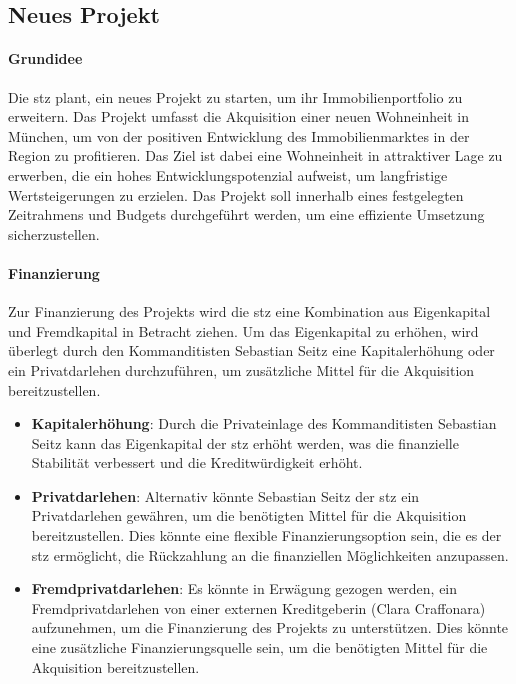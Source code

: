 \subsection{Neues Projekt} \label{subsec:Neues Projekt}


\paragraph{Grundidee} \label{para:Grundidee}

\par Die \gls{stz} plant, ein neues Projekt zu starten, um ihr Immobilienportfolio zu erweitern. Das Projekt umfasst die Akquisition einer neuen Wohneinheit in München, um von der positiven Entwicklung des Immobilienmarktes in der Region zu profitieren. Das Ziel ist dabei eine Wohneinheit in attraktiver Lage zu erwerben, die ein hohes Entwicklungspotenzial aufweist, um langfristige Wertsteigerungen zu erzielen. Das Projekt soll innerhalb eines festgelegten Zeitrahmens und Budgets durchgeführt werden, um eine effiziente Umsetzung sicherzustellen. 

\paragraph{Finanzierung}

\par Zur Finanzierung des Projekts wird die \gls{stz} eine Kombination aus Eigenkapital und Fremdkapital in Betracht ziehen. Um das Eigenkapital zu erhöhen, wird überlegt durch den Kommanditisten Sebastian Seitz eine Kapitalerhöhung oder ein Privatdarlehen durchzuführen, um zusätzliche Mittel für die Akquisition bereitzustellen. 

\begin{itemize}
    \item \textbf{Kapitalerhöhung}: Durch die Privateinlage des Kommanditisten Sebastian Seitz kann das Eigenkapital der \gls{stz} erhöht werden, was die finanzielle Stabilität verbessert und die Kreditwürdigkeit erhöht.
    \item \textbf{Privatdarlehen}: Alternativ könnte Sebastian Seitz der \gls{stz} ein Privatdarlehen gewähren, um die benötigten Mittel für die Akquisition bereitzustellen. Dies könnte eine flexible Finanzierungsoption sein, die es der \gls{stz} ermöglicht, die Rückzahlung an die finanziellen Möglichkeiten anzupassen.
    \item \textbf{Fremdprivatdarlehen}: Es könnte in Erwägung gezogen werden, ein Fremdprivatdarlehen von einer externen Kreditgeberin (Clara Craffonara) aufzunehmen, um die Finanzierung des Projekts zu unterstützen. Dies könnte eine zusätzliche Finanzierungsquelle sein, um die benötigten Mittel für die Akquisition bereitzustellen.
\end{itemize}

